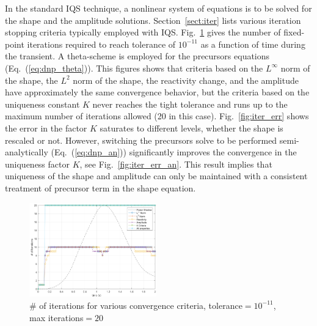 \documentclass{elsarticle}
\newcommand{\eqt}[1]{Eq.~(\ref{#1})}                     %
\newcommand{\fig}[1]{Fig.~\ref{#1}}                      %
\newcommand{\sct}[1]{Section~\ref{#1}}                   %
\begin{document}
In the standard IQS technique, a nonlinear system of equations is to be solved for the shape and the amplitude solutions. \sct{sect:iter} lists various iteration stopping criteria typically employed with IQS. \fig{fig:iter} gives the number of fixed-point iterations required to reach tolerance of $10^{-11}$ as a function of time during the transient. A theta-scheme is employed for the precursors equations (\eqt{eq:dnp_theta}).
This figures shows that criteria based on the  $L^{\infty}$ norm of the shape, the $L^2$ norm of the shape, the reactivity change, and the amplitude have approximately the same convergence behavior, but the criteria based on the uniqueness constant $K$ never reaches the tight tolerance and runs up to the maximum number of iterations allowed (20 in this case). \fig{fig:iter_err} shows the error in the factor $K$ saturates to different levels, whether the shape is rescaled or not.
However, switching the precursors solve to be performed semi-analytically (\eqt{eq:dnp_an}) significantly improves the convergence in the uniqueness factor $K$, see \fig{fig:iter_err_an}. This result implies that uniqueness of the shape and amplitude can only be maintained with a consistent treatment of precursor term in the shape equation.

\begin{figure}[!htbp]
\centering
\includegraphics[width=0.49\textwidth]{figures/iter_renorm.png}
\caption{\# of iterations for various convergence criteria, tolerance$=10^{-11}$, max iterations$=20$}
\label{fig:iter}
\end{figure}
\end{document}
